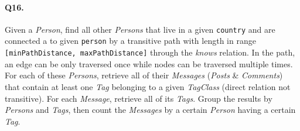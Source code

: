 \paragraph{Q16.}
Given a \emph{Person}, find all other \emph{Persons} that live in a
given \texttt{country} and are connected a to given \texttt{person} by a
transitive path with length in range
\texttt{{[}minPathDistance,\ maxPathDistance{]}} through the
\emph{knows} relation.
In the path, an edge can be only traversed once while nodes can be
traversed multiple times.
For each of these \emph{Persons}, retrieve all of their \emph{Messages}
(\emph{Posts} \& \emph{Comments}) that contain at least one \emph{Tag}
belonging to a given \emph{TagClass} (direct relation not transitive).
For each \emph{Message}, retrieve all of its \emph{Tags}.
Group the results by \emph{Persons} and \emph{Tags}, then count the
\emph{Messages} by a certain \emph{Person} having a certain \emph{Tag}.
